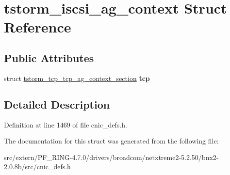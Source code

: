 \hypertarget{structtstorm__iscsi__ag__context}{
\section{tstorm\_\-iscsi\_\-ag\_\-context Struct Reference}
\label{structtstorm__iscsi__ag__context}
}
\subsection*{Public Attributes}
\begin{DoxyCompactItemize}
\item 
\hypertarget{structtstorm__iscsi__ag__context_ade5a592870797e985eca7295f0eb32a6}{
struct \hyperlink{structtstorm__tcp__tcp__ag__context__section}{tstorm\_\-tcp\_\-tcp\_\-ag\_\-context\_\-section} {\bfseries tcp}}
\label{structtstorm__iscsi__ag__context_ade5a592870797e985eca7295f0eb32a6}

\end{DoxyCompactItemize}


\subsection{Detailed Description}


Definition at line 1469 of file cnic\_\-defs.h.



The documentation for this struct was generated from the following file:\begin{DoxyCompactItemize}
\item 
src/extern/PF\_\-RING-\/4.7.0/drivers/broadcom/netxtreme2-\/5.2.50/bnx2-\/2.0.8b/src/cnic\_\-defs.h\end{DoxyCompactItemize}
